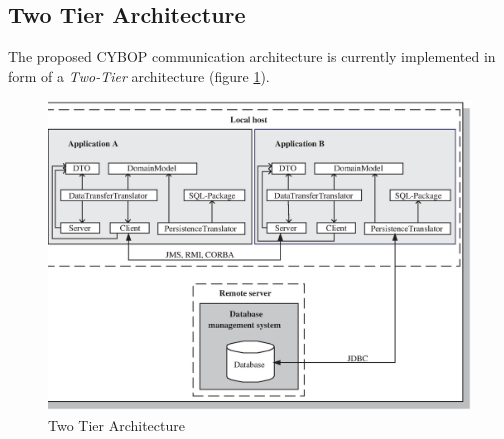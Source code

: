 %
%
%
%
%
%
%

\subsection{Two Tier Architecture}
\label{two_tier_architecture_heading}

The proposed CYBOP communication architecture is currently implemented in form
of a \emph{Two-Tier} architecture (figure \ref{two_tier_architecture_figure}).

\begin{figure}[ht]
    \begin{center}
       \includegraphics[scale=0.4]{vector/two_tier_architecture.eps}
       \caption{Two Tier Architecture}
       \label{two_tier_architecture_figure}
    \end{center}
\end{figure}

